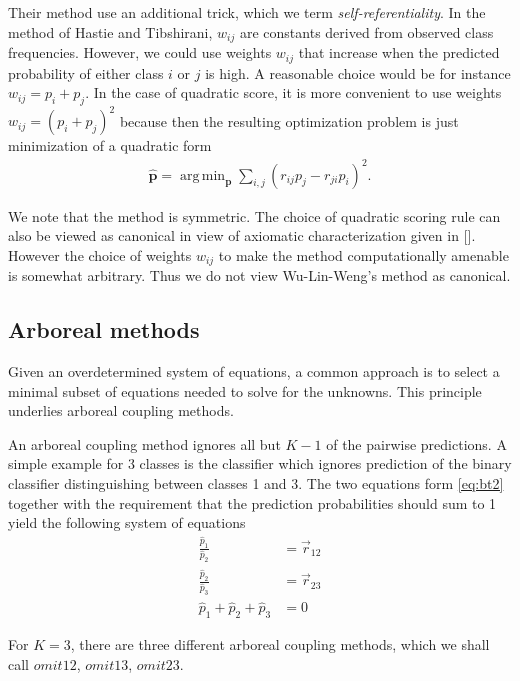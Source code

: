 \documentclass[twoside,11pt]{article}
\DeclareMathOperator*{\argmin}{arg\,min}
\begin{document}
Their method use an additional trick, which we term \emph{self-referentiality}. In the method of Hastie and Tibshirani, $w_{ij}$ are constants derived from observed class frequencies. However, we could use weights $w_{ij}$ that increase when the predicted probability of either class $i$ or $j$ is high. A reasonable choice would be for instance $w_{ij}= p_i + p_j$. In the case of quadratic score, it is more convenient to use weights $w_{ij} = (p_i + p_j)^2$ because then the resulting optimization problem is just minimization of a quadratic form
\begin{align*}
\hat{\boldsymbol{p}} = \argmin_{\boldsymbol{p}} \sum_{i,j} (r_{ij}p_j - r_{ji}p_i)^2.
\end{align*}

We note that the method is symmetric. The choice of quadratic scoring rule can also be viewed as canonical in view of axiomatic characterization given in  [\cite{selten1998axiomatic}].  However the choice of weights $w_{ij}$ to make the method computationally amenable is somewhat arbitrary. Thus we do not view Wu-Lin-Weng's method as canonical.

\subsection{Arboreal methods}


Given an overdetermined system of equations, a common approach is to select a minimal subset of equations needed to solve for the unknowns. This principle underlies arboreal coupling methods.

An arboreal coupling method ignores all but $K-1$ of the pairwise predictions. A simple example for 3 classes is the classifier which ignores prediction of the binary classifier distinguishing between classes 1 and 3. The two equations form \eqref{eq:bt2} together with the requirement that the prediction probabilities should sum to 1 yield the following system of equations
\begin{equation}
	\begin{split}
		\frac{\hat p_1}{\hat p_2} &= \vec{r}_{12}\\
		\frac{\hat p_2}{\hat p_3} &= \vec{r}_{23}\\
		\hat p_1 + \hat p_2 + \hat p_3 &= 0
	\end{split}
\end{equation}

For $K=3$, there are three different arboreal coupling methods, which we shall call $omit12$, $omit13$, $omit23$. 
\end{document}
